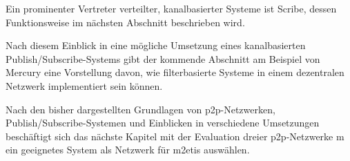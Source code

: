 Ein prominenter Vertreter verteilter, kanalbasierter Systeme ist Scribe, dessen Funktionsweise im nächsten Abschnitt beschrieben wird.



Nach diesem Einblick in eine mögliche Umsetzung eines kanalbasierten Publish/Sub\-scribe-Systems gibt der kommende Abschnitt am Beispiel von Mercury eine Vorstellung davon, wie filterbasierte Systeme in einem dezentralen Netzwerk implementiert sein können.





Nach den bisher dargestellten Grundlagen von \ac{p2p}-Netzwerken, Publish/Subscribe-Systemen und Einblicken in verschiedene Umsetzungen beschäftigt sich das nächste Kapitel mit der Evaluation dreier \ac{p2p}-Netzwerke m ein geeignetes System als Netzwerk für \ac{m2etis} auswählen.
